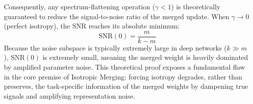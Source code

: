 \documentclass{article}
\begin{document}
Consequently, any spectrum-flattening operation ($\gamma < 1$) is theoretically guaranteed to reduce the signal-to-noise ratio of the merged update. When $\gamma \to 0$ (perfect isotropy), the SNR reaches its absolute minimum:
\begin{equation}
    \text{SNR}(0) = \frac{m}{k - m}
\end{equation}
Because the noise subspace is typically extremely large in deep networks ($k \gg m$), $\text{SNR}(0)$ is extremely small, meaning the merged weight is heavily dominated by amplified parameter noise. This theoretical proof exposes a fundamental flaw in the core premise of Isotropic Merging: forcing isotropy degrades, rather than preserves, the task-specific information of the merged weights by dampening true signals and amplifying representation noise.
\end{document}
